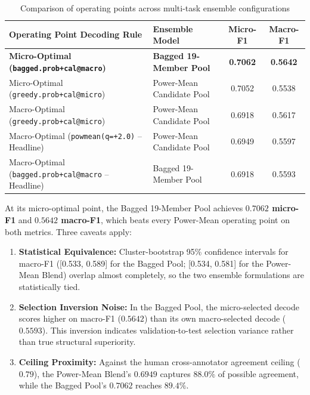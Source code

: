 \begin{table}[htbp]
  \centering
  \small
  \caption{Comparison of operating points across multi-task ensemble configurations}
  \label{tab:operating-points}
  \begin{tabularx}{\textwidth}{llcc}
    \toprule
    \textbf{Operating Point Decoding Rule} & \textbf{Ensemble Model} & \textbf{Micro-F1} & \textbf{Macro-F1} \\
    \midrule
    \textbf{Micro-Optimal (\texttt{bagged.prob+cal@macro})} & \textbf{Bagged 19-Member Pool} & \textbf{0.7062} & \textbf{0.5642} \\
    \rowcolor{lightbg}
    Micro-Optimal (\texttt{greedy.prob+cal@micro}) & Power-Mean Candidate Pool & 0.7052 & 0.5538 \\
    Macro-Optimal (\texttt{greedy.prob+cal@micro}) & Power-Mean Candidate Pool & 0.6918 & 0.5617 \\
    \rowcolor{lightbg}
    Macro-Optimal (\texttt{powmean(q=+2.0)} -- Headline) & Power-Mean Candidate Pool & 0.6949 & 0.5597 \\
    Macro-Optimal (\texttt{bagged.prob+cal@macro} -- Headline) & Bagged 19-Member Pool & 0.6918 & 0.5593 \\
    \bottomrule
  \end{tabularx}
\end{table}

At its micro-optimal point, the Bagged 19-Member Pool achieves \textbf{$0.7062$ micro-F1} and \textbf{$0.5642$ macro-F1}, which beats every Power-Mean operating point on both metrics. Three caveats apply:
\begin{enumerate}
  \item \textbf{Statistical Equivalence:} Cluster-bootstrap 95\% confidence intervals for macro-F1 ([0.533, 0.589] for the Bagged Pool; [0.534, 0.581] for the Power-Mean Blend) overlap almost completely, so the two ensemble formulations are statistically tied.
  \item \textbf{Selection Inversion Noise:} In the Bagged Pool, the micro-selected decode scores higher on macro-F1 ($0.5642$) than its own macro-selected decode ($0.5593$). This inversion indicates validation-to-test selection variance rather than true structural superiority.
  \item \textbf{Ceiling Proximity:} Against the human cross-annotator agreement ceiling ($0.79$), the Power-Mean Blend's $0.6949$ captures $88.0\%$ of possible agreement, while the Bagged Pool's $0.7062$ reaches $89.4\%$.
\end{enumerate}

